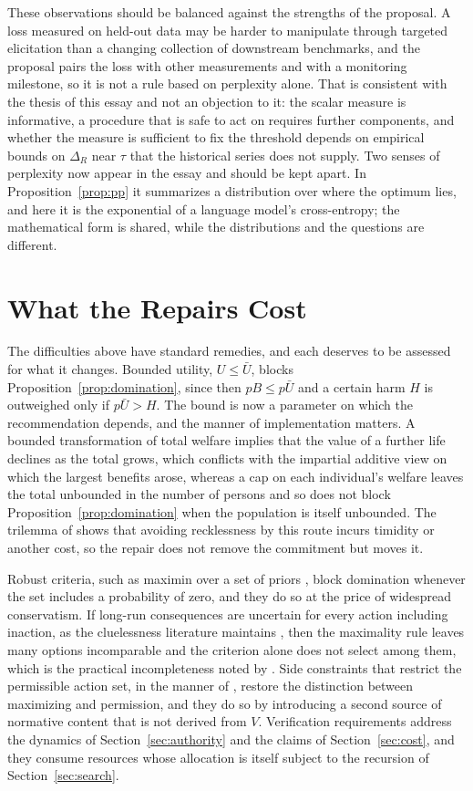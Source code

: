 \documentclass[11pt]{article}
\theoremstyle{definition}
\theoremstyle{remark}
\begin{document}
These observations should be balanced against the strengths of the proposal. A loss measured on held-out data may be harder to manipulate through targeted elicitation than a changing collection of downstream benchmarks, and the proposal pairs the loss with other measurements and with a monitoring milestone, so it is not a rule based on perplexity alone. That is consistent with the thesis of this essay and not an objection to it: the scalar measure is informative, a procedure that is safe to act on requires further components, and whether the measure is sufficient to fix the threshold depends on empirical bounds on $\Delta_R$ near $\tau$ that the historical series does not supply. Two senses of perplexity now appear in the essay and should be kept apart. In Proposition~\ref{prop:pp} it summarizes a distribution over where the optimum lies, and here it is the exponential of a language model's cross-entropy; the mathematical form is shared, while the distributions and the questions are different.

\section{What the Repairs Cost}
\label{sec:repairs}

The difficulties above have standard remedies, and each deserves to be assessed for what it changes. Bounded utility, $U\le\bar U$, blocks Proposition~\ref{prop:domination}, since then $pB\le p\bar U$ and a certain harm $H$ is outweighed only if $p\bar U>H$. The bound is now a parameter on which the recommendation depends, and the manner of implementation matters. A bounded transformation of total welfare implies that the value of a further life declines as the total grows, which conflicts with the impartial additive view on which the largest benefits arose, whereas a cap on each individual's welfare leaves the total unbounded in the number of persons and so does not block Proposition~\ref{prop:domination} when the population is itself unbounded. The trilemma of \citet{beckstead2024} shows that avoiding recklessness by this route incurs timidity or another cost, so the repair does not remove the commitment but moves it.

Robust criteria, such as maximin over a set of priors \citep{gilboa1989}, block domination whenever the set includes a probability of zero, and they do so at the price of widespread conservatism. If long-run consequences are uncertain for every action including inaction, as the cluelessness literature maintains \citep{greaves2016,mogensen2021}, then the maximality rule leaves many options incomparable and the criterion alone does not select among them, which is the practical incompleteness noted by \citet{herlitz2019}. Side constraints that restrict the permissible action set, in the manner of \citet{nozick1974}, restore the distinction between maximizing and permission, and they do so by introducing a second source of normative content that is not derived from $V$. Verification requirements address the dynamics of Section~\ref{sec:authority} and the claims of Section~\ref{sec:cost}, and they consume resources whose allocation is itself subject to the recursion of Section~\ref{sec:search}.
\end{document}
